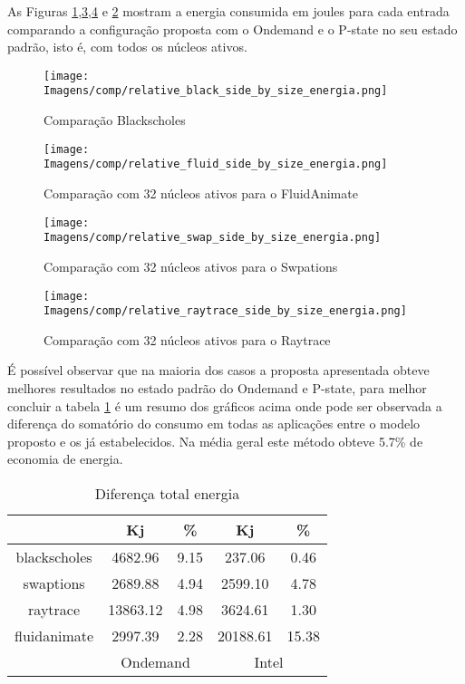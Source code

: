As Figuras \ref{fig:comp_black32},\ref{fig:comp_swap32},\ref{fig:comp_raytrace32} e \ref{fig:comp_fluid32} mostram a energia consumida em joules para cada entrada comparando a configuração proposta com o Ondemand e o P-state no seu estado padrão, isto é, com todos os núcleos ativos.

\begin{figure}[H]
	\centering
	\texttt{[image: Imagens/comp/relative\_black\_side\_by\_size\_energia.png]}
	\caption{Comparação Blackscholes}
	\label{fig:comp_black32}
\end{figure}%

\begin{figure}[H]
	\centering
	\texttt{[image: Imagens/comp/relative\_fluid\_side\_by\_size\_energia.png]}
	\caption{Comparação com 32 núcleos ativos para o FluidAnimate}
	\label{fig:comp_fluid32}
\end{figure}%

\begin{figure}[H]
	\centering
	\texttt{[image: Imagens/comp/relative\_swap\_side\_by\_size\_energia.png]}
	\caption{Comparação com 32 núcleos ativos para o Swpations}
	\label{fig:comp_swap32}
\end{figure}%

\begin{figure}[H]
	\centering
	\texttt{[image: Imagens/comp/relative\_raytrace\_side\_by\_size\_energia.png]}
	\caption{Comparação com 32 núcleos ativos para o Raytrace}
	\label{fig:comp_raytrace32}
\end{figure}%



É possível observar que na maioria dos casos a proposta apresentada obteve melhores resultados no estado padrão do Ondemand e P-state, para melhor concluir a tabela \ref{tab:dif_energia} é um resumo dos gráficos acima onde pode ser observada a diferença do somatório do consumo em todas as aplicações entre o modelo proposto e os já estabelecidos. Na média geral este método obteve 5.7\% de economia de energia.

\begin{table}[H]
	\centering
	\begin{tabular}{c|c|c|c|c|}
		& Kj              & \%          & Kj            & \%         \\ \hline
		\multicolumn{1}{c|}{blackscholes} & 4682.96         & 9.15        & 237.06        & 0.46       \\ \hline
		\multicolumn{1}{c|}{swaptions}    & 2689.88         & 4.94        & 2599.10       & 4.78       \\ \hline
		\multicolumn{1}{c|}{raytrace}     & 13863.12        & 4.98        & 3624.61       & 1.30       \\ \hline
		\multicolumn{1}{c|}{fluidanimate} & 2997.39         & 2.28        & 20188.61      & 15.38      \\ \hline
		& \multicolumn{2}{c|}{Ondemand} & \multicolumn{2}{c|}{Intel} \\%
	\end{tabular}
	\caption{Diferença total energia}
	\label{tab:dif_energia}
\end{table}

